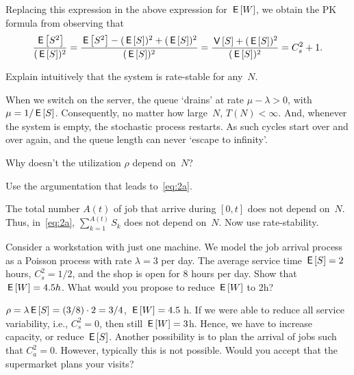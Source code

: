 \documentclass[queueing-book.tex]{subfiles}
\begin{document}
Replacing this expression in the above expression for $\,\mathsf{E}\left[W\right]$, we obtain the PK formula from observing that
\begin{equation*}
\frac{\,\mathsf{E}\left[S^2\right]}{(\,\mathsf{E}\left[S\right])^2} =  \frac{\,\mathsf{E}\left[S^2\right] - (\,\mathsf{E}\left[S\right])^{2} + (\,\mathsf{E}\left[S\right])^{2}}{(\,\mathsf{E}\left[S\right])^2} = \frac{\,\mathsf{V}\left[S\right] + (\,\mathsf{E}\left[S\right])^{2}}{(\,\mathsf{E}\left[S\right])^{2}} = C_s^2 +1.
\end{equation*}




\begin{exercise}
Explain intuitively that the system is rate-stable for any~$N$.
\begin{solution}
  When we switch on the server, the queue `drains' at rate $\mu-\lambda>0$, with $\mu=1/\,\mathsf{E}\left[S\right]$.
  Consequently, no matter how large~$N$, $T(N)<\infty$.
  And, whenever the system is empty, the stochastic process restarts.
  As such cycles start over and over again, and the queue length can never `escape to infinity'.
\end{solution}
\end{exercise}


\begin{exercise}
  Why doesn't  the utilization $\rho$ depend on~$N$?
\begin{hint}
 Use the argumentation that leads to~\cref{eq:2a}.
\end{hint}
\begin{solution}
  The total number $A(t)$ of job that arrive during $[0,t]$ does not depend on~$N$.
  Thus, in~\cref{eq:2a}, $\sum_{k=1}^{A(t)}S_k$ does not depend on~$N$.
  Now use rate-stability.
\end{solution}
\end{exercise}


\begin{exercise}\label{ex:l-241}
 Consider a workstation with just one machine.
 We model the job arrival process as a Poisson process with rate $\lambda=3$ per day.
 The average service time $\,\mathsf{E}\left[S\right] = 2$ hours, $C^2_s = 1/2$, and the shop is open for 8 hours per day.
Show that  $\,\mathsf{E}\left[W\right] = 4.5h$. What would you propose to reduce $\,\mathsf{E}\left[W\right]$ to 2h?
\begin{solution}
$\rho = \lambda \,\mathsf{E}\left[S\right] = (3/8)\cdot 2 = 3/4$, $\,\mathsf{E}\left[W\right] = 4.5$ h.
If we were able to reduce all service variability, i.e., $C_s^2=0$, then still $\,\mathsf{E}\left[W\right] = 3$h.
Hence, we have to increase capacity, or reduce $\,\mathsf{E}\left[S\right]$.
Another possibility is to plan the arrival of jobs such that $C_a^2=0$.
However, typically this is not possible.
Would you accept that the supermarket plans your visits?
\end{solution}
\end{exercise}
\end{document}
